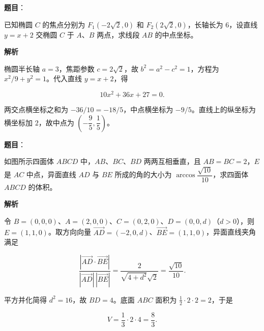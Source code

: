 \begin{answer}

\textbf{题目}：

已知椭圆 $C$ 的焦点分别为 $F_1(-2\sqrt2,0)$ 和 $F_2(2\sqrt2,0)$，长轴长为 6，设直线 $y=x+2$ 交椭圆 $C$ 于 $A\text{、}B$ 两点，求线段 $AB$ 的中点坐标。

\textbf{解析}

椭圆半长轴 $a=3$，焦距参数 $c=2\sqrt2$，故 $b^2=a^2-c^2=1$，方程为 $x^2/9+y^2=1$。代入直线 $y=x+2$，得

\nopagebreak[4]
\[
10x^2+36x+27=0.
\]

两交点横坐标之和为 $-36/10=-18/5$，中点横坐标为 $-9/5$。直线上的纵坐标为横坐标加 $2$，故中点为 $\left(-\dfrac95,\dfrac15\right)$。


\end{answer}
\begin{answer}

\textbf{题目}：

如图所示四面体 $ABCD$ 中，$AB$、$BC$、$BD$ 两两互相垂直，且 $AB=BC=2$，$E$ 是 $AC$ 中点，异面直线 $AD$ 与 $BE$ 所成的角的大小为 $\arccos\dfrac{\sqrt{10}}{10}$，求四面体 $ABCD$ 的体积。
\nopagebreak[4]
\begin{center}\end{center}
\nopagebreak[4]
\textbf{解析}

令 $B=(0,0,0)$、$A=(2,0,0)$、$C=(0,2,0)$、$D=(0,0,d)$（$d>0$），则 $E=(1,1,0)$。取方向向量 $\overrightarrow{AD}=(-2,0,d)$、$\overrightarrow{BE}=(1,1,0)$，异面直线夹角满足

\nopagebreak[4]
\[
\frac{|\overrightarrow{AD}\cdot\overrightarrow{BE}|}
{|\overrightarrow{AD}|\,|\overrightarrow{BE}|}
=\frac{2}{\sqrt{4+d^2}\sqrt2}
=\frac{\sqrt{10}}{10}.
\]

平方并化简得 $d^2=16$，故 $BD=4$。底面 $ABC$ 面积为 $\frac12\cdot2\cdot2=2$，于是

\nopagebreak[4]
\[
V=\frac13\cdot2\cdot4=\frac83.
\]


\end{answer}
